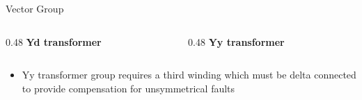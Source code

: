 \begin{frame}{Vector Group}
  \begin{columns}[T,onlytextwidth]
    \begin{column}{0.48\textwidth}
      \centering
      \textbf{Yd transformer}\\[0.4em]
      \begin{minipage}[c][0.62\textheight][c]{\linewidth}
        \centering
      \end{minipage}
    \end{column}
    \begin{column}{0.48\textwidth}
      \centering
      \textbf{Yy transformer}\\[0.4em]
      \begin{minipage}[c][0.62\textheight][c]{\linewidth}
        \centering
      \end{minipage}
    \end{column}
  \end{columns}

   \begin{itemize}
    \setlength{\itemsep}{0.3em}
    \item Yy transformer group requires a third winding which must be delta connected to provide compensation for unsymmetrical faults
  \end{itemize} 

\end{frame}

